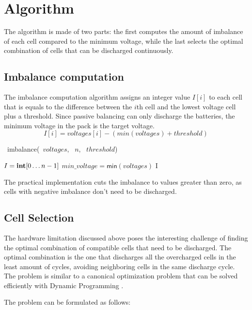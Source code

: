 \section{Algorithm}

The algorithm is made of two parts: the first computes the amount of imbalance of each cell compared to the minimum voltage, while the last selects the optimal combination of cells that can be discharged continuously.

\subsection{Imbalance computation}

The imbalance computation algorithm assigns an integer value $I[i]$ to each cell that is equals to the difference between the $i$th cell and the lowest voltage cell plus a threshold. Since passive balancing can only discharge the batteries, the minimum voltage in the pack is the target voltage.
\[
    I[i] = voltages[i] - (min(voltages) + threshold)
\]

\begin{algorithm}[H]
    \DontPrintSemicolon
    \NoCaptionOfAlgo
    \caption[imbalance]{\INTARRAY\ \textsf{imbalance}(\INTARRAY\ $voltages$, \INTEGER\ $n$, \INTEGER\ $threshold$)}\label{algorithm:imbalance}

    $I = \INTEGER[0 \ldots n-1]$\;
    $min\_voltage=\textsf{min}(voltages)$\;
    \Return I\;
\end{algorithm}
The practical implementation cuts the imbalance to values greater than zero, as cells with negative imbalance don't need to be discharged.

\subsection{Cell Selection}
The hardware limitation discussed above poses the interesting challenge of finding the optimal combination of compatible cells that need to be discharged. The optimal combination is the one that discharges all the overcharged cells in the least amount of cycles, avoiding neighboring cells in the same discharge cycle. The problem is similar to a canonical optimization problem that can be solved efficiently with Dynamic Programming \cite{montresor}.

The problem can be formulated as follows:

